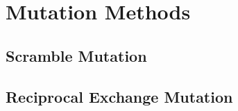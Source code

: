 \section{Mutation Methods}

\subsection{Scramble Mutation}

\subsection{Reciprocal Exchange Mutation}